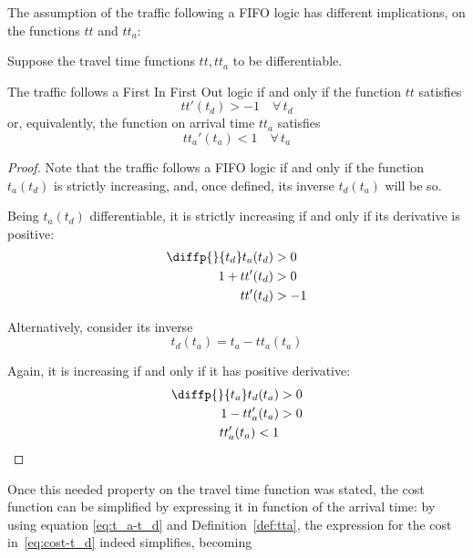 The assumption of the traffic following a FIFO logic has different implications,
on the functions \(tt\) and \(tt_a\):

\begin{lemma}
  \label{lemma:bounded-der-tt}
  Suppose the travel time functions \(tt, tt_a\) to be differentiable.
  
  The traffic follows a First In First Out logic if and only if the function \(tt\) satisfies
  \begin{equation*}
    tt'(t_d) > -1\quad \forall \, t_d
  \end{equation*}
  or, equivalently, the function on arrival time \(tt_a\) satisfies
  \begin{equation*}
    tt_a'(t_a) < 1\quad \forall \, t_a
  \end{equation*}
\end{lemma}
\begin{proof}
  Note that the traffic follows a FIFO logic if and only if the function \(t_a(t_d)\) is strictly increasing,
  and, once defined, its inverse \(t_d(t_a)\) will be so.
  
  Being \(t_a(t_d)\) differentiable, it is strictly increasing if and only if its derivative is positive:
  \begin{align*}
    \diffp{}{{t_d}} t_a(t_d) & > 0 \\
    1 + tt'(t_d) & > 0 \\
    tt'(t_d) & > -1
  \end{align*}
  
  Alternatively, consider its inverse
  \begin{equation*}
    t_d(t_a) = t_a - tt_a(t_a)
  \end{equation*}

  Again, it is increasing if and only if it has positive derivative:
  \begin{align*}
    \diffp{}{{t_a}} t_d(t_a) & > 0 \\
    1 - tt_a'(t_a) & > 0 \\
    tt_a'(t_a) < 1
  \end{align*}
\end{proof}

Once this needed property on the travel time function was stated,
the cost function can be simplified by expressing it in function of the arrival time:
by using equation \eqref{eq:t_a-t_d} and Definition~\ref{def:tta},
the expression for the cost in~\eqref{eq:cost-t_d} indeed simplifies,
becoming

